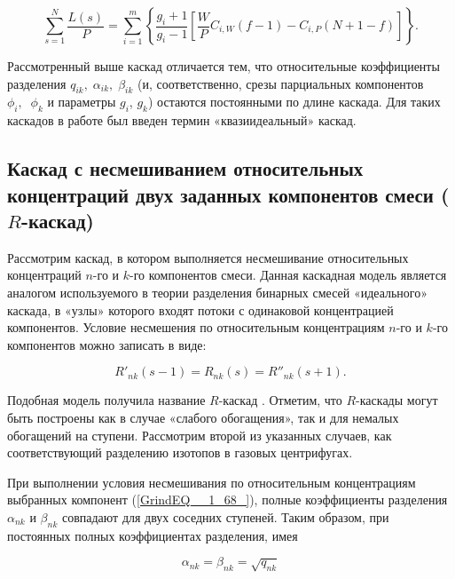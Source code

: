 \begin{equation} \label{GrindEQ__1_62_} 
  \sum _{s=1}^{N}\frac{L(s)}{P} =\sum _{i=1}^{m}\left\{\frac{g_{i} +1}{g_{i} -1} \left[\frac{W}{P} C_{i,W} (f-1)-C_{i,P} \left(N+1-f\right)\right]\right\}  .   
\end{equation} 
  
Рассмотренный выше каскад отличается тем, что относительные коэффициенты разделения $q_{ik} ,\; \alpha _{ik} ,\; \beta _{ik} $ (и, соответственно, срезы парциальных компонентов $\phi _{i} ,\; \; \phi _{k} $ и параметры $g_{i} $, $g_{k} $) остаются постоянными по длине каскада. Для таких каскадов в работе \cite{sazykinKvaziidealnyeKaskadyDlya2000} был введен термин «квазиидеальный» каскад.

\subsection{Каскад с несмешиванием относительных концентраций двух заданных компонентов смеси ($R$-каскад)}\label{R_cas}

Рассмотрим каскад, в котором выполняется несмешивание относительных концентраций $n$-го и $k$-го компонентов смеси. Данная каскадная модель является аналогом используемого в теории разделения бинарных смесей «идеального» каскада, в «узлы» которого входят потоки с одинаковой концентрацией компонентов. Условие несмешения по относительным концентрациям $n$-го и $k$-го компонентов можно записать в виде:

\begin{equation} \label{GrindEQ__1_68_} 
  R'_{nk} (s-1)=R_{nk} (s)=R''_{nk} (s+1).                                                 
\end{equation} 

Подобная модель получила название $R$-каскад \cite{sulaberidzeTeoriyaKaskadovDlya2011}. Отметим, что $R$-каскады могут быть построены как в случае «слабого обогащения», так и для немалых обогащений на ступени. Рассмотрим второй из указанных случаев, как соответствующий разделению изотопов в газовых центрифугах.

При выполнении условия несмешивания по относительным концентрациям выбранных компонент (\ref{GrindEQ__1_68_}), полные коэффициенты разделения $\alpha _{nk}$ и $\beta _{nk}$ совпадают для двух соседних ступеней. Таким образом, при постоянных полных коэффициентах разделения, имея

\begin{equation} \label{GrindEQ__1_69_} 
  \alpha _{nk} =\beta _{nk} =\sqrt{q_{nk} }  
\end{equation} 

